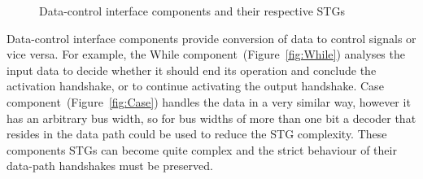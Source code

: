 \begin{figure}
\begin{raggedright}
\par\end{raggedright}

\caption{Data-control interface components and their respective STGs\label{fig:Data-control-interface-components}}
\end{figure}


Data-control interface components provide conversion of data to control
signals or vice versa. For example, the While component~(Figure~\ref{fig:While})
analyses the input data to decide whether it should end its operation
and conclude the activation handshake, or to continue activating the
output handshake. Case component~(Figure~\ref{fig:Case}) handles
the data in a very similar way, however it has an arbitrary bus width,
so for bus widths of more than one bit a decoder that resides in the
data path could be used to reduce the STG complexity. These components
STGs can become quite complex and the strict behaviour of their data-path
handshakes must be preserved.



